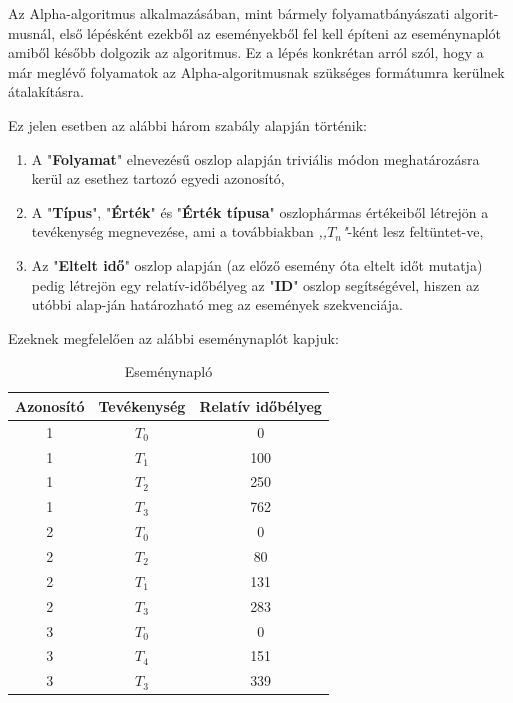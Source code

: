 \begin{example}
	Az Alpha-algoritmus alkalmazásában, mint bármely folyamatbányászati algorit\hyp{}musnál, első lépésként ezekből az eseményekből fel kell építeni az eseménynaplót amiből később dolgozik az algoritmus. Ez a lépés konkrétan arról szól, hogy a már meglévő folyamatok az Alpha-algoritmusnak szükséges formátumra kerülnek átalakításra.
	
	Ez jelen esetben az alábbi három szabály alapján történik:
	\begin{enumerate}
		\item A "\textbf{Folyamat}" elnevezésű oszlop alapján triviális módon meghatározásra kerül az esethez tartozó egyedi azonosító,
		\item A "\textbf{Típus}", "\textbf{Érték}" és "\textbf{Érték típusa}" oszlophármas értékeiből létrejön a tevékenység megnevezése,  ami a továbbiakban \textit{,,$T_{n}$"}-ként lesz feltüntet\hyp{}ve,
		\item Az "\textbf{Eltelt idő}" oszlop alapján (az előző esemény óta eltelt időt mutatja) pedig létrejön egy relatív-időbélyeg az "\textbf{ID}" oszlop segítségével, hiszen az utóbbi alap\hyp{}ján határozható meg az események szekvenciája.
	\end{enumerate}
	
	Ezeknek megfelelően az alábbi eseménynaplót kapjuk:
	\newpage

	\begin{table}[h]
	\begin{center}
	\caption{Eseménynapló}
	\begin{tabular}{|| c | c | c ||}
		\hline
		Azonosító & Tevékenység & Relatív időbélyeg \\ [0.5ex]
		\hline\hline
		1 & $T_0$ & 0 \\
		\hline
		1 & $T_1$ & 100 \\
		\hline
		1 & $T_2$ & 250 \\
		\hline
		1 & $T_3$ & 762 \\
		\hline
		2 & $T_0$ & 0 \\
		\hline
		2 & $T_2$ & 80 \\
		\hline
		2 & $T_1$ & 131 \\
		\hline
		2 & $T_3$ & 283 \\
		\hline
		3 & $T_0$ & 0 \\
		\hline
		3 & $T_4$ & 151 \\
		\hline
		3 & $T_3$ & 339 \\
		\hline
	\end{tabular}
	\label{fig:planexample}
	\end{center}
	\end{table}	
	

\end{example}
